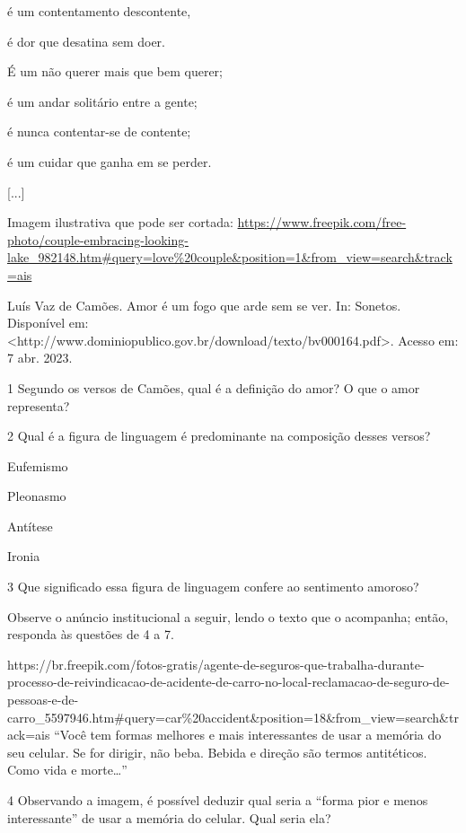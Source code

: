 é um contentamento descontente,

é dor que desatina sem doer.

É um não querer mais que bem querer;

é um andar solitário entre a gente;

é nunca contentar-se de contente;

é um cuidar que ganha em se perder.

{[}...{]}

Imagem ilustrativa que pode ser cortada:
\url{https://www.freepik.com/free-photo/couple-embracing-looking-lake_982148.htm\#query=love\%20couple\&position=1\&from_view=search\&track=ais}

Luís Vaz de Camões. Amor é um fogo que arde sem se ver. In: Sonetos.
Disponível em:
\textless{}http://www.dominiopublico.gov.br/download/texto/bv000164.pdf\textgreater{}.
Acesso em: 7 abr. 2023.

\num{1} Segundo os versos de Camões, qual é a definição do amor? O que o
amor representa? 

\num{2} Qual é a figura de linguagem é predominante na composição desses
versos?

 Eufemismo

 Pleonasmo

 Antítese

 Ironia

\num{3} Que significado essa figura de linguagem confere ao sentimento
amoroso? 

Observe o anúncio institucional a seguir, lendo o texto que o acompanha;
então, responda às questões de 4 a 7.

https://br.freepik.com/fotos-gratis/agente-de-seguros-que-trabalha-durante-processo-de-reivindicacao-de-acidente-de-carro-no-local-reclamacao-de-seguro-de-pessoas-e-de-carro\_5597946.htm\#query=car\%20accident\&position=18\&from\_view=search\&track=ais
``Você tem formas melhores e mais interessantes de usar a memória do seu
celular. Se for dirigir, não beba. Bebida e direção são termos
antitéticos. Como vida e morte\ldots{}''

\num{4} Observando a imagem, é possível deduzir qual seria a ``forma
pior e menos interessante'' de usar a memória do celular. Qual seria
ela? 

